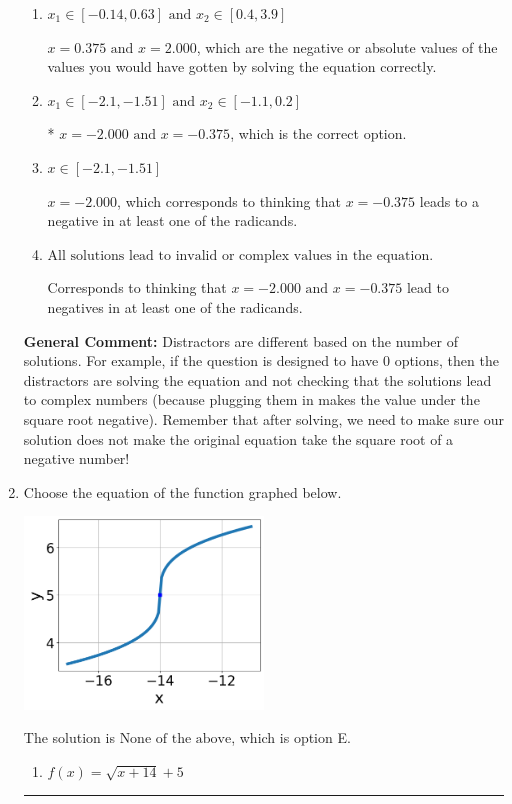 \documentclass{extbook}[14pt]
\newcommand{\litem}[1]{\item #1

\rule{\textwidth}{0.4pt}}
\begin{document}
\begin{enumerate}
{\begin{enumerate}[label=\Alph*.]
$x = -0.375$, which corresponds to thinking that $x = -2.000$ leads to a negative in at least one of the radicands.
\item \( x_1 \in [-0.14, 0.63] \text{ and } x_2 \in [0.4,3.9] \)

$x = 0.375 \text{ and } x = 2.000$, which are the negative or absolute values of the values you would have gotten by solving the equation correctly.
\item \( x_1 \in [-2.1, -1.51] \text{ and } x_2 \in [-1.1,0.2] \)

* $x = -2.000 \text{ and } x = -0.375$, which is the correct option.
\item \( x \in [-2.1,-1.51] \)

$x = -2.000$, which corresponds to thinking that $x = -0.375$ leads to a negative in at least one of the radicands.
\item \( \text{All solutions lead to invalid or complex values in the equation.} \)

Corresponds to thinking that $x = -2.000 \text{ and } x = -0.375$ lead to negatives in at least one of the radicands.
\end{enumerate}

\textbf{General Comment:} Distractors are different based on the number of solutions. For example, if the question is designed to have 0 options, then the distractors are solving the equation and not checking that the solutions lead to complex numbers (because plugging them in makes the value under the square root negative). Remember that after solving, we need to make sure our solution does not make the original equation take the square root of a negative number!
}
\litem{
Choose the equation of the function graphed below.

\begin{center}
    \includegraphics[width=0.5\textwidth]{../Figures/radicalGraphToEquationCopyB.png}
\end{center}


The solution is \( \text{None of the above} \), which is option E.\begin{enumerate}[label=\Alph*.]
\item \( f(x) = \sqrt{x + 14} + 5 \)


\end{enumerate}}
\end{enumerate}
\end{document}
